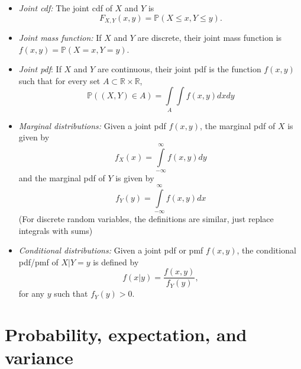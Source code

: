 \documentclass[11pt]{article}
\begin{document}
\begin{itemize}
\item \textit{Joint cdf:} The joint cdf of $X$ and $Y$ is
$$F_{X, Y}(x, y) = \mathbb{P}(X \leq x, Y \leq y).$$

\item \textit{Joint mass function:} If $X$ and $Y$ are discrete, their joint mass function is $f(x,y) = \mathbb{P}(X = x, Y = y)$.

\item \textit{Joint pdf}: If $X$ and $Y$ are continuous, their joint pdf is the function $f(x, y)$ such that for every set $A \subset \mathbb{R} \times \mathbb{R}$,
$$\mathbb{P}((X, Y) \in A) = \int \limits_A \int f(x, y) dx dy$$

\item \textit{Marginal distributions:} Given a joint pdf $f(x,y)$, the marginal pdf of $X$ is given by
$$f_X(x) = \int \limits_{-\infty}^\infty f(x, y) dy$$
and the marginal pdf of $Y$ is given by
$$f_Y(y) = \int \limits_{-\infty}^\infty f(x, y) dx$$
(For discrete random variables, the definitions are similar, just replace integrals with sums)

\item \textit{Conditional distributions:} Given a joint pdf or pmf $f(x,y)$, the conditional pdf/pmf of $X|Y = y$ is defined by
$$f(x|y) = \frac{f(x,y)}{f_Y(y)},$$
for any $y$ such that $f_Y(y) > 0$.
\end{itemize}



\section*{Probability, expectation, and variance}
\end{document}
